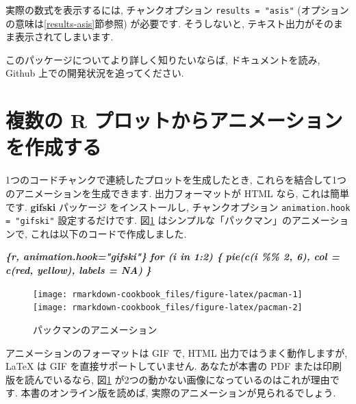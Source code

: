 \documentclass[
  11pt,
  lualatex,ja=standard,jafont=noto]{bxjsreport}
\newenvironment{Shaded}{\begin{snugshade}}{\end{snugshade}}
\newcommand{\InformationTok}[1]{\textcolor[rgb]{0.56,0.35,0.01}{\textbf{\textit{#1}}}}
\begin{document}
実際の数式を表示するには, チャンクオプション \texttt{results = "asis"} (オプションの意味は\ref{results-asis}節参照) が必要です. そうしないと, テキスト出力がそのまま表示されてしまいます.

このパッケージについてより詳しく知りたいならば, ドキュメントを読み, Github 上での開発状況を追ってください.

\hypertarget{animation}{%
\section{複数の R プロットからアニメーションを作成する}\label{animation}}

1つのコードチャンクで連続したプロットを生成したとき, これらを結合して1つのアニメーションを生成できます. 出力フォーマットが HTML なら, これは簡単です. \textbf{gifski} パッケージ \autocite{R-gifski} をインストールし, チャンクオプション \texttt{animation.hook = "gifski"} 設定するだけです. 図\ref{fig:pacman} はシンプルな「パックマン」のアニメーションで, これは以下のコードで作成しました.

\begin{Shaded}
\begin{Highlighting}[]
\InformationTok{\textasciigrave{}\textasciigrave{}\textasciigrave{}\{r, animation.hook="gifski"\}}
\InformationTok{for (i in 1:2) \{}
\InformationTok{  pie(c(i \%\% 2, 6), col = c(\textquotesingle{}red\textquotesingle{}, \textquotesingle{}yellow\textquotesingle{}), labels = NA)}
\InformationTok{\}}
\InformationTok{\textasciigrave{}\textasciigrave{}\textasciigrave{}}
\end{Highlighting}
\end{Shaded}

\begin{figure}

{\centering \texttt{[image: rmarkdown-cookbook\_files/figure-latex/pacman-1]} \texttt{[image: rmarkdown-cookbook\_files/figure-latex/pacman-2]} 

}

\caption{パックマンのアニメーション}\label{fig:pacman}
\end{figure}

アニメーションのフォーマットは GIF で, HTML 出力ではうまく動作しますが, LaTeX は GIF を直接サポートしていません. あなたが本書の PDF または印刷版を読んでいるなら, 図\ref{fig:pacman} が2つの動かない画像になっているのはこれが理由です. 本書のオンライン版を読めば, 実際のアニメーションが見られるでしょう.
\end{document}
